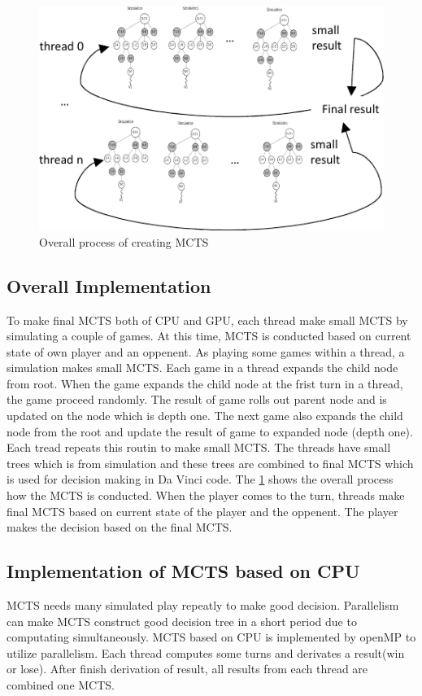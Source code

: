 \begin{figure}
\includegraphics[width=0.95\columnwidth]{figures/implementation.pdf}
\caption{Overall process of creating MCTS}
\label{fig:implementation}
\end{figure}

\subsection{Overall Implementation}
To make final MCTS both of CPU and GPU, each thread make small MCTS by simulating a couple of games.
At this time, MCTS is conducted based on current state of own player and an oppenent.
As playing some games within a thread, a simulation makes small MCTS.
Each game in a thread expands the child node from root. 
When the game expands the child node at the frist turn in a thread, the game proceed randomly. 
The result of game rolls out parent node and is updated on the node which is depth one. 
The next game also expands the child node from the root and update the result of game to expanded node (depth one).
Each tread repeats this routin to make small MCTS. 
The threads have small trees which is from simulation and these trees are combined to final MCTS which is used for decision making in Da Vinci code. 
The \cref{fig:implementation} shows the overall process how the MCTS is conducted.
When the player comes to the turn, threads make final MCTS based on current state of the player and the oppenent. 
The player makes the decision based on the final MCTS. 

\subsection{Implementation of MCTS based on CPU}
MCTS needs many simulated play repeatly to make good decision. 
Parallelism can make MCTS construct good decision tree in a short period due to computating simultaneously. 
MCTS based on CPU is implemented by openMP to utilize parallelism. Each thread computes some turns and derivates a result(win or lose). 
After finish derivation of result, all results from each thread are combined one MCTS.


